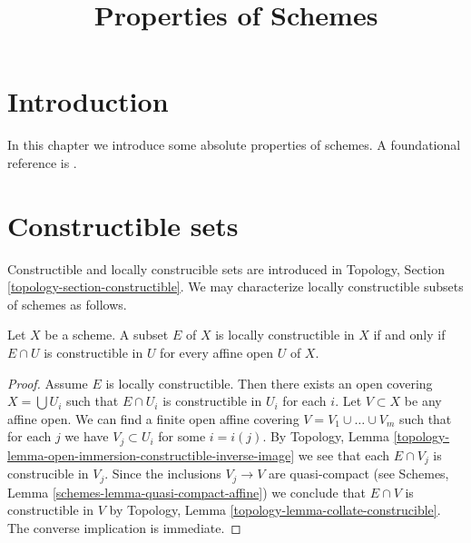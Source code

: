 

%


\title{Properties of Schemes}


\maketitle

\label{section-phantom}

\tableofcontents

\section{Introduction}
\label{section-introduction}

\noindent
In this chapter we introduce some absolute properties of schemes.
A foundational reference is \cite{EGA}.




\section{Constructible sets}
\label{section-constructible}

\noindent
Constructible and locally construcible sets are introduced in
Topology, Section \ref{topology-section-constructible}.
We may characterize locally constructible subsets of schemes as
follows.

\begin{lemma}
\label{lemma-locally-constructible}
Let $X$ be a scheme.
A subset $E$ of $X$ is locally constructible in $X$ if and only if
$E \cap U$ is constructible in $U$ for every affine open $U$ of $X$.
\end{lemma}

\begin{proof}
Assume $E$ is locally constructible. Then there exists an open covering
$X = \bigcup U_i$ such that $E \cap U_i$ is constructible in $U_i$
for each $i$. Let $V \subset X$ be any affine open. We can find a finite
open affine covering $V = V_1 \cup \ldots \cup V_m$ such that for each $j$
we have $V_j \subset U_i$ for some $i = i(j)$. By
Topology, Lemma \ref{topology-lemma-open-immersion-constructible-inverse-image}
we see that each $E \cap V_j$ is construcible in $V_j$. Since the inclusions
$V_j \to V$ are quasi-compact (see
Schemes, Lemma \ref{schemes-lemma-quasi-compact-affine})
we conclude that $E \cap V$ is constructible in $V$ by
Topology, Lemma \ref{topology-lemma-collate-construcible}.
The converse implication is immediate.
\end{proof}

